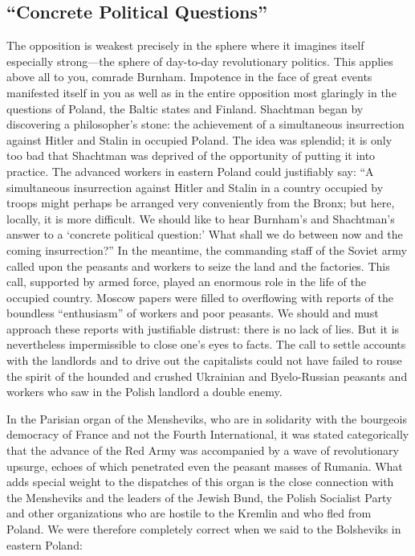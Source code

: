 \subsection*{“Concrete Political Questions”}

The opposition is weakest precisely in the sphere where it imagines itself especially strong---the sphere of day-to-day revolutionary politics. This applies above all to you, comrade Burnham. Impotence in the face of great events manifested itself in you as well as in the entire opposition most glaringly in the questions of Poland, the Baltic states and Finland. Shachtman began by discovering a philosopher’s stone: the achievement of a simultaneous insurrection against Hitler and Stalin in occupied Poland. The idea was splendid; it is only too bad that Shachtman was deprived of the opportunity of putting it into practice. The advanced workers in eastern Poland could justifiably say: ``A simultaneous insurrection against Hitler and Stalin in a country occupied by troops might perhaps be arranged very conveniently from the Bronx; but here, locally, it is more difficult. We should like to hear Burnham’s and Shachtman’s answer to a ‘concrete political question:’ What shall we do between now and the coming insurrection?” In the meantime, the commanding staff of the Soviet army called upon the peasants and workers to seize the land and the factories. This call, supported by armed force, played an enormous role in the life of the occupied country. Moscow papers were filled to overflowing with reports of the boundless “enthusiasm” of workers and poor peasants. We should and must approach these reports with justifiable distrust: there is no lack of lies. But it is nevertheless impermissible to close one’s eyes to facts. The call to settle accounts with the landlords and to drive out the capitalists could not have failed to rouse the spirit of the hounded and crushed Ukrainian and Byelo-Russian peasants and workers who saw in the Polish landlord a double enemy.

In the Parisian organ of the Mensheviks, who are in solidarity with the bourgeois democracy of France and not the Fourth International, it was stated categorically that the advance of the Red Army was accompanied by a wave of revolutionary upsurge, echoes of which penetrated even the peasant masses of Rumania. What adds special weight to the dispatches of this organ is the close connection with the Mensheviks and the leaders of the Jewish Bund, the Polish Socialist Party and other organizations who are hostile to the Kremlin and who fled from Poland. We were therefore completely correct when we said to the Bolsheviks in eastern Poland:

